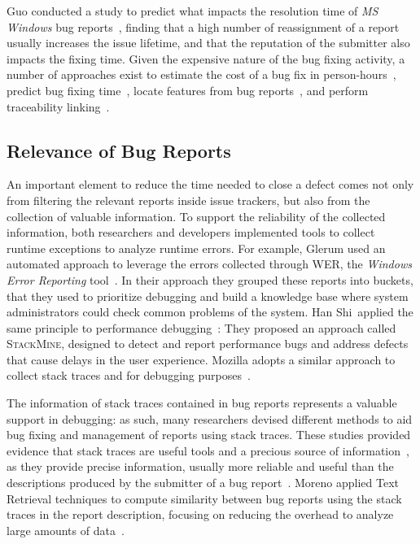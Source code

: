Guo \etal conducted a study to predict what impacts the resolution time of \textit{MS Windows} bug reports~\cite{Guo2010}, finding that a high number of reassignment of a report usually increases the issue lifetime, and that the reputation of the submitter also impacts the fixing time.
Given the expensive nature of the bug fixing activity, a number of approaches exist to estimate the cost of a bug fix in person-hours~\cite{Weis2007a}, predict bug fixing time~\cite{Gige2010}, locate features from bug reports~\cite{Dit2013a}, and perform traceability linking~\cite{Biss2013a}.


\subsection{Relevance of Bug Reports}

An important element to reduce the time needed to close a defect comes not only from filtering the relevant reports inside issue trackers, but also from the collection of valuable information.
To support the reliability of the collected information, both researchers and developers implemented tools to collect runtime exceptions to analyze runtime errors.
For example, Glerum \etal used an automated approach to leverage the errors collected through WER, the \emph{Windows Error Reporting} tool~\cite{Glerum2009}.
In their approach they grouped these reports into buckets, that they used to prioritize debugging and build a knowledge base where system administrators could check common problems of the system.
Han Shi~\etal applied the same principle to performance debugging~\cite{Han2012}: They proposed an approach called \textsc{StackMine}, designed to detect and report performance bugs and address defects that cause delays in the user experience.
Mozilla adopts a similar approach to collect stack traces and for debugging purposes~\cite{McLa2004}.

The information of stack traces contained in bug reports represents a valuable support in debugging: as such, many researchers devised different methods to aid bug fixing and management of reports using stack traces.
These studies provided evidence that stack traces are useful tools and a precious source of information~\cite{Davie2013,Wang2013,Brod2005,Weis2007a}, as they provide precise information, usually more reliable and useful than the descriptions produced by the submitter of a bug report~\cite{Ko2006}.
Moreno \etal applied Text Retrieval techniques to compute similarity between bug reports using the stack traces in the report description, focusing on reducing the overhead to analyze large amounts of data~\cite{Moreno2014}.

